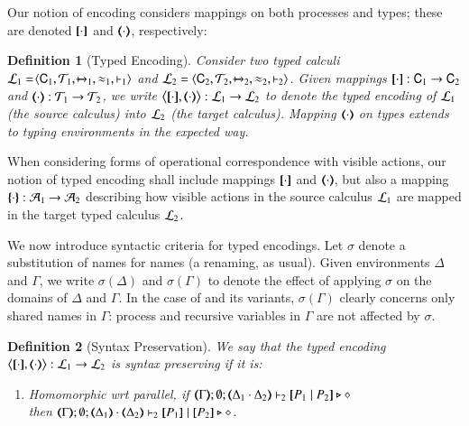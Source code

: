 \documentclass[preprint,11pt]{elsarticle}
\newtheorem{definition}{Definition}[section]
\begin{document}
{Our notion of encoding considers mappings on both processes 
and types; these are denoted $[\!\![\cdot]\!\!]$ and $(\!\!\langle\cdot\rangle\!\!)$, respectively: %

\begin{definition}[Typed Encoding]%
\label{def:tenc}
        Consider two typed calculi
        $\mathcal{L}_1=\!\langle \mathsf{C}_1, {\cal{T}}_1, \xmapsto{~}_1, \approx_1, \vdash_1 \rangle$
        and
        $\mathcal{L}_2=\langle \mathsf{C}_2, {\cal{T}}_2, \xmapsto{~}_2, \approx_2, \vdash_2 \rangle$.
	Given mappings $[\!\![\cdot]\!\!]: \mathsf{C}_1 \to \mathsf{C}_2$ and
	$(\!\!\langle\cdot\rangle\!\!): {\cal{T}}_1 \to {\cal{T}}_2$, 
	we write 
		$\enco{\map{\cdot}, \mapt{\cdot}} : 
	\tyl{L}_1 \to \tyl{L}_2$ to denote the \emph{typed encoding} of $\mathcal{L}_1$ (the \emph{source calculus}) into $\mathcal{L}_2$ (the \emph{target  calculus}).
Mapping $(\!\!\langle\cdot\rangle\!\!)$ on types extends to typing
environments in the expected way. %
\end{definition}


When considering forms of operational correspondence with visible actions, 
our notion of typed encoding shall include mappings $[\!\![\cdot]\!\!]$ and $(\!\!\langle\cdot\rangle\!\!)$, but also
a  mapping  $\{\!\!\{\cdot\}\!\!\}:\mathcal{A}_1 \to \mathcal{A}_2$ 
describing how visible actions in the source calculus $\mathcal{L}_1$ are mapped in the target typed calculus $\mathcal{L}_2$.


We now introduce syntactic criteria for typed encodings.
Let $\sigma$ denote a substitution of names for names (a renaming, as usual). Given environments $\Delta$ and $\Gamma$,
we write $\sigma(\Delta)$ and $\sigma(\Gamma)$ to denote the effect of applying $\sigma$ on the 
domains of $\Delta$ and $\Gamma$.
In the case of \HOp and its variants,  $\sigma(\Gamma)$ clearly concerns only shared names in $\Gamma$: process and recursive variables in $\Gamma$ are not affected by $\sigma$. 


\begin{definition}[Syntax Preservation]%
	\label{def:sep}
	We say that the
	typed encoding 
	$\enco{\map{\cdot}, \mapt{\cdot}}: \tyl{L}_1 \to \tyl{L}_2$ is \emph{syntax preserving}
	if it is:
	
	\begin{enumerate}[1.]
		\item	\emph{Homomorphic wrt parallel},   if 
		$\mapt{\Gamma}; \emptyset; \mapt{\Delta_1 \cat \Delta_2} \proves_2 \map{P_1 \Par P_2} \hastype \Proc$ \\
		then 
		$\mapt{\Gamma}; \emptyset; \mapt{\Delta_1} \cat \mapt{\Delta_2} \proves_2 \map{P_1} \Par \map{P_2} \hastype \Proc$.


\end{enumerate}
\end{definition}}
\end{document}
